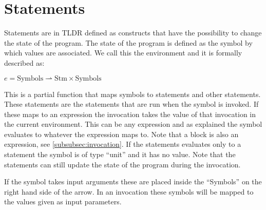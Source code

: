 \section{Statements}\label{sec:statements}
Statements are in TLDR defined as constructs that have the possibility to change the state of the program. The state of the program is defined as the symbol by which values are associated. We call this the environment and it is formally described as:
\begin{center}
$e = \text{Symbols} \rightharpoonup \text{Stm} \times \text{Symbols}$
\end{center}
This is a partial function that maps symbols to statements and other statements. These statements are the statements that are run when the symbol is invoked. If these maps to an expression the invocation takes the value of that invocation in the current environment. This can be any expression and as explained the symbol evaluates to whatever the expression maps to. Note that a block is also an expression, see \cref{subsubsec:invocation}. If the statements evaluates only to a statement the symbol is of type \enquote{unit} and it has no value. Note that the statements can still update the state of the program during the invocation. 

If the symbol takes input arguments these are placed inside the \enquote{Symbols} on the right hand side of the arrow. In an invocation these symbols will be mapped to the values given as input parameters.






